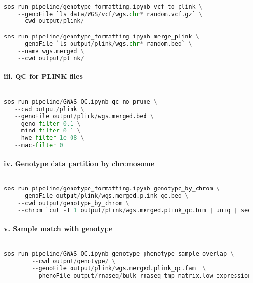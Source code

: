 \documentclass[12pt]{article}
\begin{document}
\noindent
\begin{lstlisting}[language=Python]

sos run pipeline/genotype_formatting.ipynb vcf_to_plink \
    --genoFile `ls data/WGS/vcf/wgs.chr*.random.vcf.gz` \
    --cwd output/plink/ 

sos run pipeline/genotype_formatting.ipynb merge_plink \
    --genoFile `ls output/plink/wgs.chr*.random.bed` \
    --name wgs.merged \
    --cwd output/plink/

\end{lstlisting}




\paragraph*{iii. QC for PLINK files}


\noindent
\begin{lstlisting}[language=Python]

sos run pipeline/GWAS_QC.ipynb qc_no_prune \
   --cwd output/plink \
   --genoFile output/plink/wgs.merged.bed \
   --geno-filter 0.1 \
   --mind-filter 0.1 \
   --hwe-filter 1e-08 \
   --mac-filter 0

\end{lstlisting}




\paragraph*{iv. Genotype data partition by chromosome}


\noindent
\begin{lstlisting}[language=Python]

sos run pipeline/genotype_formatting.ipynb genotype_by_chrom \
    --genoFile output/plink/wgs.merged.plink_qc.bed \
    --cwd output/genotype_by_chrom \
    --chrom `cut -f 1 output/plink/wgs.merged.plink_qc.bim | uniq | sed "s/chr//g"`

\end{lstlisting}




\paragraph*{v. Sample match with genotype}


\noindent
\begin{lstlisting}[language=Python]

sos run pipeline/GWAS_QC.ipynb genotype_phenotype_sample_overlap \
        --cwd output/genotype/ \
        --genoFile output/plink/wgs.merged.plink_qc.fam  \
        --phenoFile output/rnaseq/bulk_rnaseq_tmp_matrix.low_expression_filtered.outlier_removed.tmm.expression.bed.bed.gz

\end{lstlisting}
\end{document}
